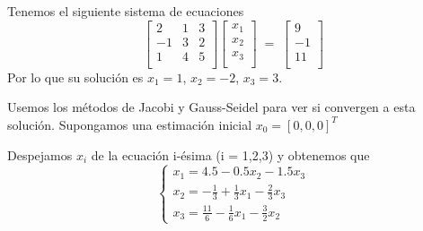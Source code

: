 \begin{ejemplo}
Tenemos el siguiente sistema de ecuaciones
\[ \begin{bmatrix}
2 & 1 & 3 \\
-1 & 3 & 2 \\
1 & 4 & 5 \\
\end{bmatrix}
\begin{bmatrix}
x_1 \\
x_2 \\
x_3 \\
\end{bmatrix} 
\; = \;
\begin{bmatrix}
9 \\
-1 \\
11 \\
\end{bmatrix}
\]
Por lo que su solución es $x_1 = 1$, $x_2 = -2$, $x_3 = 3$.

Usemos los métodos de Jacobi y Gauss-Seidel para ver si convergen a esta solución. Supongamos una estimación inicial $x_0 = \left[ 0,0,0 \right] ^T$

Despejamos $x_i$ de la ecuación i-ésima (i = 1,2,3) y obtenemos que
\[ \left\{ \begin{array}{c}
x_1 = 4.5 - 0.5x_2 - 1.5x_3 \\
x_2 = - \frac{1}{3} + \frac{1}{3} x_1 - \frac{2}{3} x_3 \\
x_3 = \frac{11}{6} - \frac{1}{6} x_1 - \frac{3}{2} x_2
\end{array}
\right. \]


\end{ejemplo}
